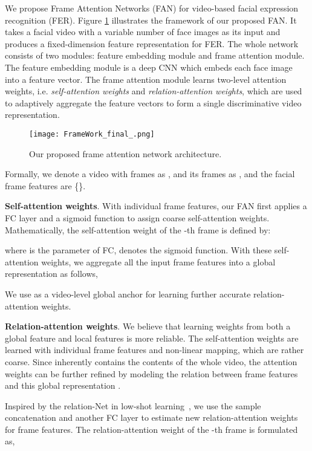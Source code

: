 \documentclass{article}
\begin{document}
We propose Frame Attention Networks (FAN) for video-based facial expression recognition (FER). Figure \ref{fig_fan} illustrates the framework of our proposed FAN. It takes a facial video with a variable number of face images as its input and produces a fixed-dimension feature representation for FER. The whole network consists of two modules: feature embedding module and frame attention module. The feature embedding module is a deep CNN which embeds each face image into a feature vector. The frame attention module learns two-level attention weights, i.e. \textit{self-attention weights} and \textit{relation-attention weights}, which are used to adaptively aggregate the feature vectors to form a single discriminative video representation. 

\begin{figure}[htp]
\centering
\texttt{[image: FrameWork\_final\_.png]}
\caption{Our proposed frame attention network architecture.}
\label{fig_fan}
\end{figure}

Formally, we denote a video with  frames as , and its frames as ,  and the facial frame features are \{\}.


\textbf{Self-attention weights}. With individual frame features, our FAN first applies a FC layer and a sigmoid function to assign coarse self-attention weights. Mathematically, the self-attention weight of the -th frame is defined by: 


where  is the parameter of FC,  denotes the sigmoid function. 
With these self-attention weights, we aggregate all the input frame features into a global representation  as follows,


We use  as a video-level global anchor for learning further accurate relation-attention weights. 

\textbf{Relation-attention weights}. We believe that learning weights from both a global feature and local features is more reliable.
The self-attention weights are learned with individual frame features and non-linear mapping, which are rather coarse. Since  inherently contains the contents of the whole video, the attention weights can be further refined by modeling the relation between frame features and this global representation .

Inspired by the relation-Net in low-shot learning~\cite{yang2018learning}, we use the sample concatenation and another FC layer to estimate new relation-attention weights for frame features. The relation-attention weight of the -th frame is formulated as,
\end{document}
